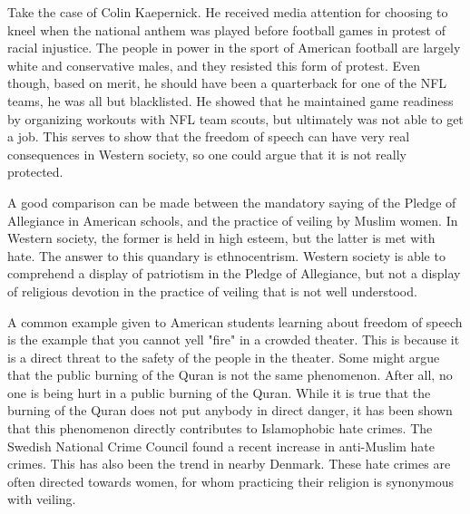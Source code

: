 \documentclass[12pt,letterpaper]{article}
\begin{document}
\begin{flushleft}
Take the case of Colin Kaepernick. He received media attention for choosing to kneel when the national anthem was played before football games in protest of racial injustice. The people in power in the sport of American football are largely white and conservative males, and they resisted this form of protest. Even though, based on merit, he should have been a quarterback for one of the NFL teams, he was all but blacklisted. He showed that he maintained game readiness by organizing workouts with NFL team scouts, but ultimately was not able to get a job. \autocite{noauthor_colin_2020} This serves to show that the freedom of speech can have very real consequences in Western society, so one could argue that it is not really protected.

A good comparison can be made between the mandatory saying of the Pledge of Allegiance in American schools, and the practice of veiling by Muslim women. In Western society, the former is held in high esteem, but the latter is met with hate. The answer to this quandary is ethnocentrism. Western society is able to comprehend a display of patriotism in the Pledge of Allegiance, but not a display of religious devotion in the practice of veiling that is not well understood.

A common example given to American students learning about freedom of speech is the example that you cannot yell "fire" in a crowded theater. This is because it is a direct threat to the safety of the people in the theater. Some might argue that the public burning of the Quran is not the same phenomenon. After all, no one is being hurt in a public burning of the Quran. While it is true that the burning of the Quran does not put anybody in direct danger, it has been shown that this phenomenon directly contributes to Islamophobic hate crimes. The Swedish National Crime Council found a recent increase in anti-Muslim hate crimes. This has also been the trend in nearby Denmark. These hate crimes are often directed towards women, for whom practicing their religion is synonymous with veiling. \autocite{boxerman_whats_2023}


\end{flushleft}
\end{document}
